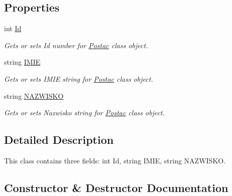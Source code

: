 \subsection*{Properties}
\begin{DoxyCompactItemize}
\item 
int \hyperlink{class_projekt_p_o_s_1_1_postac_aaea65193e5fe149a84854074e281b39c}{Id}
\begin{DoxyCompactList}\small\item\em Gets or sets Id number for \hyperlink{class_projekt_p_o_s_1_1_postac}{Postac} class object. \end{DoxyCompactList}\item 
string \hyperlink{class_projekt_p_o_s_1_1_postac_adf6ea1a5ed6c787ecffc0dff69385adb}{I\+M\+IE}
\begin{DoxyCompactList}\small\item\em Gets or sets I\+M\+IE string for \hyperlink{class_projekt_p_o_s_1_1_postac}{Postac} class object. \end{DoxyCompactList}\item 
string \hyperlink{class_projekt_p_o_s_1_1_postac_acd714441caa5a6cb52b9ae9628b01c3f}{N\+A\+Z\+W\+I\+S\+KO}
\begin{DoxyCompactList}\small\item\em Gets or sets Nazwisko string for \hyperlink{class_projekt_p_o_s_1_1_postac}{Postac} class object. \end{DoxyCompactList}\end{DoxyCompactItemize}


\subsection{Detailed Description}
This class contains three fields\+: int Id, string I\+M\+IE, string N\+A\+Z\+W\+I\+S\+KO. 



\subsection{Constructor \& Destructor Documentation}
\mbox{\label{class_projekt_p_o_s_1_1_postac_a6b6554d7106f9a7eeca65485dede1783}} 

